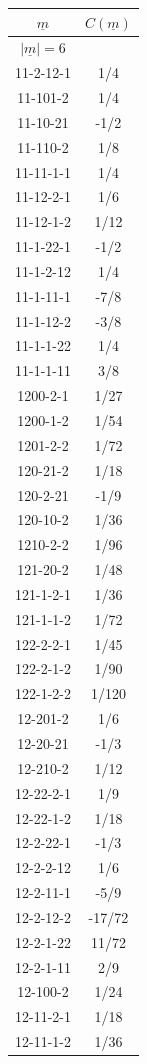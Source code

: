 \begin{tabular}[t]{|cc|}
\hline
$\underline{m}$ & $C(\underline{m})$\\
\hline\hline
$|\underline{m}|=6$&\\
\hline
11-2-12-1 &  1/4\\
11-101-2 &  1/4\\
11-10-21 &  -1/2\\
11-110-2 &  1/8\\
11-11-1-1 &  1/4\\
11-12-2-1 &  1/6\\
11-12-1-2 &  1/12\\
11-1-22-1 &  -1/2\\
11-1-2-12 &  1/4\\
11-1-11-1 &  -7/8\\
11-1-12-2 &  -3/8\\
11-1-1-22 &  1/4\\
11-1-1-11 &  3/8\\
1200-2-1 &  1/27\\
1200-1-2 &  1/54\\
1201-2-2 &  1/72\\
120-21-2 &  1/18\\
120-2-21 &  -1/9\\
120-10-2 &  1/36\\
1210-2-2 &  1/96\\
121-20-2 &  1/48\\
121-1-2-1 &  1/36\\
121-1-1-2 &  1/72\\
122-2-2-1 &  1/45\\
122-2-1-2 &  1/90\\
122-1-2-2 &  1/120\\
12-201-2 &  1/6\\
12-20-21 &  -1/3\\
12-210-2 &  1/12\\
12-22-2-1 &  1/9\\
12-22-1-2 &  1/18\\
12-2-22-1 &  -1/3\\
12-2-2-12 &  1/6\\
12-2-11-1 &  -5/9\\
12-2-12-2 &  -17/72\\
12-2-1-22 &  11/72\\
12-2-1-11 &  2/9\\
12-100-2 &  1/24\\
12-11-2-1 &  1/18\\
12-11-1-2 &  1/36\\

\end{tabular}
